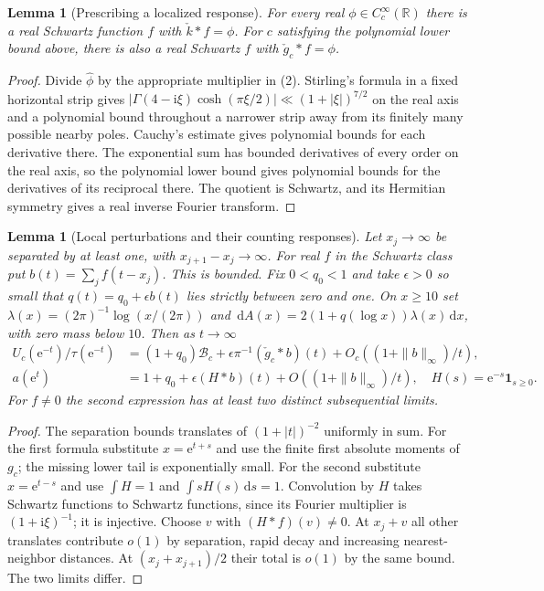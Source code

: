 \documentclass[11pt,letterpaper]{article}
\newtheorem{lemma}[theorem]{Lemma}
\theoremstyle{definition}
\newcommand{\R}{\mathbb R}
\newcommand{\dd}{\,\mathrm d}
\newcommand{\ii}{\mathrm i}
\newcommand{\ee}{\mathrm e}
\newcommand{\BB}{\mathcal B}
\begin{document}
\begin{lemma}[Prescribing a localized response]\label{lem:invert}
For every real $\phi\in C_c^\infty(\R)$ there is a real Schwartz function $f$ with $\check k*f=\phi$. For $c$ satisfying the polynomial lower bound above, there is also a real Schwartz $f$ with $\check g_c*f=\phi$.
\end{lemma}
\begin{proof}
Divide $\widehat\phi$ by the appropriate multiplier in (2). Stirling's formula in a fixed horizontal strip gives
$|\Gamma(4-\ii\xi)\cosh(\pi\xi/2)|\ll(1+|\xi|)^{7/2}$ on the real axis and a polynomial bound throughout a narrower strip away from its finitely many possible nearby poles. Cauchy's estimate gives polynomial bounds for each derivative there. The exponential sum has bounded derivatives of every order on the real axis, so the polynomial lower bound gives polynomial bounds for the derivatives of its reciprocal there. The quotient is Schwartz, and its Hermitian symmetry gives a real inverse Fourier transform.
\end{proof}
\begin{lemma}[Local perturbations and their counting responses]\label{lem:pulse}
Let $x_j\to\infty$ be separated by at least one, with $x_{j+1}-x_j\to\infty$. For real $f$ in the Schwartz class put $b(t)=\sum_j f(t-x_j)$. This is bounded. Fix $0<q_0<1$ and take $\epsilon>0$ so small that $q(t)=q_0+\epsilon b(t)$ lies strictly between zero and one. On $x\ge10$ set $\lambda(x)=(2\pi)^{-1}\log(x/(2\pi))$ and $\dd A(x)=2(1+q(\log x))\lambda(x)\dd x$, with zero mass below $10$. Then as $t\to\infty$
\begin{align*}
 U_c(\ee^{-t})/\tau(\ee^{-t})
 &= (1+q_0)\BB_c +\epsilon\pi^{-1}(\check g_c*b)(t)+O_c((1+\|b\|_\infty)/t),\\
 a(\ee^t)&=1+q_0+\epsilon (H*b)(t)+O((1+\|b\|_\infty)/t),
 \quad H(s)=\ee^{-s}\mathbf 1_{s\ge0}.
\end{align*}
For $f\ne0$ the second expression has at least two distinct subsequential limits.
\end{lemma}
\begin{proof}
The separation bounds translates of $(1+|t|)^{-2}$ uniformly in sum. For the first formula substitute $x=\ee^{t+s}$ and use the finite first absolute moments of $g_c$; the missing lower tail is exponentially small. For the second substitute $x=\ee^{t-s}$ and use $\int H=1$ and $\int sH(s)\dd s=1$. Convolution by $H$ takes Schwartz functions to Schwartz functions, since its Fourier multiplier is $(1+\ii\xi)^{-1}$; it is injective. Choose $v$ with $(H*f)(v)\ne0$. At $x_j+v$ all other translates contribute $o(1)$ by separation, rapid decay and increasing nearest-neighbor distances. At $(x_j+x_{j+1})/2$ their total is $o(1)$ by the same bound. The two limits differ.
\end{proof}
\end{document}
